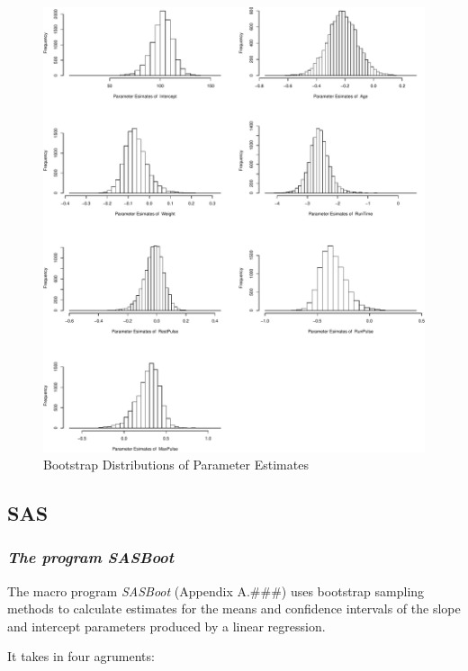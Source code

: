\documentclass[]{article}
\begin{document}
\begin{figure}
\centering
\includegraphics{Report_files/figure-latex/rcode-1.pdf}
\caption{\label{fig:rcode} Bootstrap Distributions of Parameter
Estimates}
\end{figure}

\pagebreak 

\subsection{SAS}\label{sas}

\subsubsection{\texorpdfstring{\emph{The program
SASBoot}}{The program SASBoot}}\label{the-program-sasboot}

The macro program \emph{SASBoot} (Appendix A.\#\#\#) uses bootstrap
sampling methods to calculate estimates for the means and confidence
intervals of the slope and intercept parameters produced by a linear
regression.

It takes in four agruments:
\end{document}
